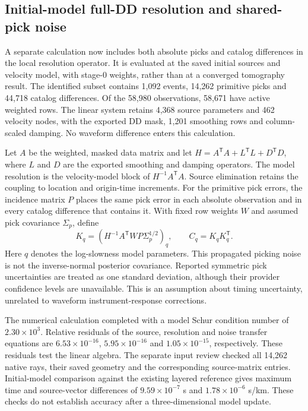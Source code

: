 \subsection{Initial-model full-DD resolution and shared-pick noise}

A separate calculation now includes both absolute picks and catalog
differences in the local resolution operator. It is evaluated at the saved
initial sources and velocity model, with stage-0 weights, rather than at a
converged tomography result. The identified subset contains 1,092 events,
14,262 primitive picks and 44,718 catalog differences. Of the 58,980
observations, 58,671 have active weighted rows. The linear system retains
4,368 source parameters and 462 velocity nodes, with the exported DD mask,
1,201 smoothing rows and column-scaled damping. No waveform difference enters
this calculation.

Let $A$ be the weighted, masked data matrix and let
$H=A^{\mathsf T}A+L^{\mathsf T}L+D^{\mathsf T}D$, where $L$ and $D$ are the
exported smoothing and damping operators. The model resolution is the
velocity-model block of $H^{-1}A^{\mathsf T}A$. Source elimination retains
the coupling to location and origin-time increments. For the primitive pick
errors, the incidence matrix $P$ places the same pick error in each absolute
observation and in every catalog difference that contains it. With fixed row
weights $W$ and assumed pick covariance $\Sigma_p$, define
\begin{equation}
 K_q=\left(H^{-1}A^{\mathsf T}W P\Sigma_p^{1/2}\right)_q,
 \qquad C_q=K_qK_q^{\mathsf T}.
\end{equation}
Here $q$ denotes the log-slowness model parameters. This propagated picking
noise is not the inverse-normal posterior covariance. Reported symmetric
pick uncertainties are treated as one standard deviation, although their
provider confidence levels are unavailable. This is an assumption about
timing uncertainty, unrelated to waveform instrument-response corrections.

The numerical calculation completed with a model Schur condition number of
$2.30\times10^3$. Relative residuals of the source, resolution and noise
transfer equations are $6.53\times10^{-16}$, $5.95\times10^{-16}$ and
$1.05\times10^{-15}$, respectively. These residuals test the linear algebra.
The separate input review checked all 14,262 native rays, their saved geometry
and the corresponding source-matrix entries. Initial-model comparison against
the existing layered reference gives maximum time and source-vector
differences of $9.59\times10^{-7}$ s and $1.78\times10^{-6}$ s/km. These
checks do not establish accuracy after a three-dimensional model update.

